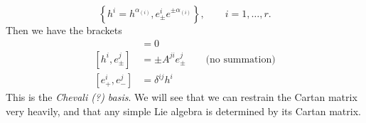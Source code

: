 \begin{equation}
  \left\{ h^{i} = h^{\alpha_{(i)}}, e^{i}_{\pm} e^{\pm \alpha_{(i)}} \right\}, \qquad i = 1, \dots, r.
\end{equation}
Then we have the brackets
\begin{align}
  [h^{i}, h.j] &= 0 \\
  [h^{i}, e^{j}_\pm] &= \pm A^{ji} e^{j}_\pm \qquad \text{(no summation)} \\
  [e_+^{i}, e^{j}_-] &= \delta^{ij} h^{i}
\end{align}
This is the \emph{Chevali (?) basis}.
We will see that we can restrain the Cartan matrix very heavily, and that any simple Lie algebra is determined by its Cartan matrix.
